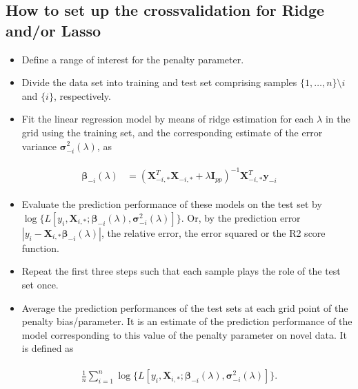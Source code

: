 \documentclass[letterpaper,10pt,english]{sphinxmanual}
\begin{document}
\subsection{How to set up the cross\sphinxhyphen{}validation for Ridge and/or Lasso}
\label{\detokenize{chapter4:how-to-set-up-the-cross-validation-for-ridge-and-or-lasso}}\begin{itemize}
\item {} 
Define a range of interest for the penalty parameter.

\item {} 
Divide the data set into training and test set comprising samples \(\{1, \ldots, n\} \setminus i\) and \(\{ i \}\), respectively.

\item {} 
Fit the linear regression model by means of ridge estimation  for each \(\lambda\) in the grid using the training set, and the corresponding estimate of the error variance \(\boldsymbol{\sigma}_{-i}^2(\lambda)\), as

\end{itemize}
\begin{equation*}
\begin{split}
\begin{align*}
\boldsymbol{\beta}_{-i}(\lambda) & =  ( \boldsymbol{X}_{-i, \ast}^{T}
\boldsymbol{X}_{-i, \ast} + \lambda \boldsymbol{I}_{pp})^{-1}
\boldsymbol{X}_{-i, \ast}^{T} \boldsymbol{y}_{-i}
\end{align*}
\end{split}
\end{equation*}\begin{itemize}
\item {} 
Evaluate the prediction performance of these models on the test set by \(\log\{L[y_i, \boldsymbol{X}_{i, \ast}; \boldsymbol{\beta}_{-i}(\lambda), \boldsymbol{\sigma}_{-i}^2(\lambda)]\}\). Or, by the prediction error \(|y_i - \boldsymbol{X}_{i, \ast} \boldsymbol{\beta}_{-i}(\lambda)|\), the relative error, the error squared or the R2 score function.

\item {} 
Repeat the first three steps  such that each sample plays the role of the test set once.

\item {} 
Average the prediction performances of the test sets at each grid point of the penalty bias/parameter. It is an estimate of the prediction performance of the model corresponding to this value of the penalty parameter on novel data. It is defined as

\end{itemize}
\begin{equation*}
\begin{split}
\begin{align*}
\frac{1}{n} \sum_{i = 1}^n \log\{L[y_i, \mathbf{X}_{i, \ast}; \boldsymbol{\beta}_{-i}(\lambda), \boldsymbol{\sigma}_{-i}^2(\lambda)]\}.
\end{align*}
\end{split}
\end{equation*}
\end{document}
